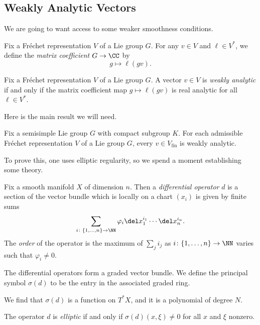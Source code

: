 \documentclass[../notes.tex]{subfiles}
\begin{document}
\subsection{Weakly Analytic Vectors}
We are going to want access to some weaker smoothness conditions.
\begin{definition}
	Fix a Fr\'echet representation $V$ of a Lie group $G$. For any $v\in V$ and $\ell\in V^*$, we define the \textit{matrix coefficient} $G\to\CC$ by
	\[g\mapsto\ell(gv).\]
\end{definition}
\begin{definition}
	Fix a Fr\'echet representation $V$ of a Lie group $G$. A vector $v\in V$ is \textit{weakly analytic} if and only if the matrix coefficient map $g\mapsto\ell(gv)$ is real analytic for all $\ell\in V^*$.
\end{definition}
Here is the main result we will need.
\begin{theorem} \label{thm:h-c-analytic}
	Fix a semisimple Lie group $G$ with compact subgroup $K$. For each admissible Fr\'echet representation $V$ of a Lie group $G$, every $v\in V_{\mathrm{fin}}$ is weakly analytic.
\end{theorem}
To prove this, one uses elliptic regularity, so we spend a moment establishing some theory.
\begin{definition}
	Fix a smooth manifold $X$ of dimension $n$. Then a \textit{differential operator} $d$ is a section of the vector bundle which is locally on a chart $(x_i)$ is given by finite sums
	\[\sum_{i\colon\{1,\ldots,n\}\to\NN}\varphi_i\del x_1^{i_1}\cdots\del x_n^{i_n}.\]
	The \textit{order} of the operator is the maximum of $\sum_ji_j$ as $i\colon\{1,\ldots,n\}\to\NN$ varies such that $\varphi_i\ne0$.
\end{definition}
\begin{remark}
	The differential operators form a graded vector bundle. We define the principal symbol $\sigma(d)$ to be the entry in the associated graded ring.
\end{remark}
\begin{remark}
	We find that $\sigma(d)$ is a function on $T^*X$, and it is a polynomial of degree $N$.
\end{remark}
\begin{definition}[elliptic]
	The operator $d$ is \textit{elliptic} if and only if $\sigma(d)(x,\xi)\ne0$ for all $x$ and $\xi$ nonzero.
\end{definition}
\end{document}
